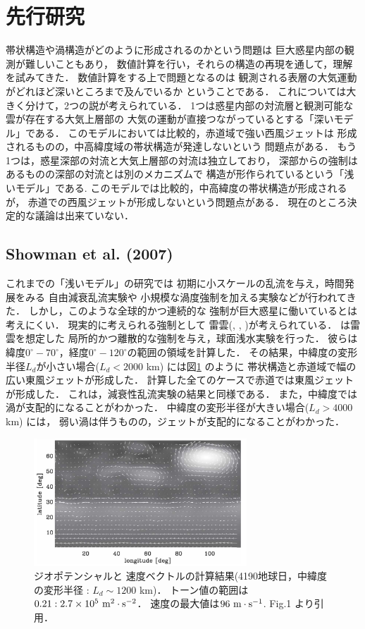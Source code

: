 \documentclass[a4j,12pt,openbib,oneside]{jreport}
\begin{document}
\section{先行研究}
\label{sec:intro2}
帯状構造や渦構造がどのように形成されるのかという問題は
巨大惑星内部の観測が難しいこともあり，
数値計算を行い，それらの構造の再現を通して，理解を試みてきた．
%
数値計算をする上で問題となるのは
観測される表層の大気運動がどれほど深いところまで及んでいるか
ということである．
これについては大きく分けて，2つの説が考えられている．
%
1つは惑星内部の対流層と観測可能な雲が存在する大気上層部の
大気の運動が直接つながっているとする「深いモデル」である．
このモデルにおいては比較的，赤道域で強い西風ジェットは
形成されるものの，中高緯度域の帯状構造が発達しないという
問題点がある\citep{CHRISTENSEN2002}．
%
もう1つは，惑星深部の対流と大気上層部の対流は独立しており，
深部からの強制はあるものの深部の対流とは別のメカニズムで
構造が形作られているという「浅いモデル」である.
このモデルでは比較的，中高緯度の帯状構造が形成されるが，
赤道での西風ジェットが形成しないという問題点がある\citep{Scott2007}．
%
現在のところ決定的な議論は出来ていない．
%
%
\subsection{Showman et al. (2007)}
\label{sec:intro21}
これまでの「浅いモデル」の研究では
初期に小スケールの乱流を与え，時間発展をみる
自由減衰乱流実験\citep{Yoden1993}や
小規模な渦度強制を加える実験\citep{Scott2007}などが行われてきた．
%
しかし，このような全球的かつ連続的な
強制が巨大惑星に働いているとは考えにくい．
%
現実的に考えられる強制として
雷雲(\cite{Gierasch2000}, \cite{Porco2005}, \cite{Ingersoll2000})が考えられている．
%
\cite{Showman2007}は雷雲を想定した
局所的かつ離散的な強制を与え，球面浅水実験を行った．
彼らは緯度$0^\circ - 70^\circ$，経度$0^\circ - 120^\circ$の範囲の領域を計算した．
その結果，中緯度の変形半径$L_d$が小さい場合($L_d < 2000$ km) には図\ref{fig3} のように
帯状構造と赤道域で幅の広い東風ジェットが形成した．
計算した全てのケースで赤道では東風ジェットが形成した．
これは，減衰性乱流実験の結果と同様である\citep{Cho1996}．
また，中緯度では渦が支配的になることがわかった．
%
中緯度の変形半径が大きい場合($L_d > 4000$ km) には，
弱い渦は伴うものの，ジェットが支配的になることがわかった．
%
%
\begin{figure}[H]
  \begin{center}
    \includegraphics[clip,width=8cm]{./fig/intro/fig3.png}
    \caption{
      \footnotesize{ジオポテンシャルと
速度ベクトルの計算結果(4190地球日，中緯度の変形半径 : $L_d \sim 1200$ km)．
トーン値の範囲は$0.21 : 2.7 \times 10^5 \rm{~m^2 \cdot s^{-2}}$．
速度の最大値は$96 \rm{~m \cdot s^{-1}}$.
\cite{Showman2007} Fig.1 より引用．
      }
    }
    \label{fig3}
  \end{center}
\end{figure}
%
\end{document}
